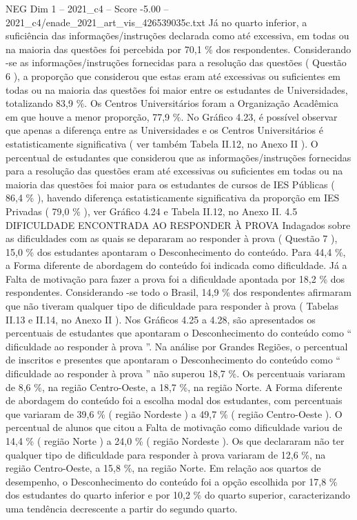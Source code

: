 \begin{textsample}{NEG Dim 1 – 2021\_c4 – Score -5.00 – 2021\_c4/enade\_2021\_art\_vis\_426539035c.txt}
Já no quarto inferior, a suficiência das informações/instruções declarada como até excessiva, em todas ou na maioria das questões foi percebida por 70,1 \% dos respondentes.
Considerando -se as informações/instruções fornecidas para a resolução das questões ( Questão 6 ), a proporção que considerou que estas eram até excessivas ou suficientes em todas ou na maioria das questões foi maior entre os estudantes de Universidades, totalizando 83,9 \%.
Os Centros Universitários foram a Organização Acadêmica em que houve a menor proporção, 77,9 \%.
No Gráfico 4.23, é possível observar que apenas a diferença entre as Universidades e os Centros Universitários é estatisticamente significativa ( ver também Tabela II.12, no Anexo II ).
O percentual de estudantes que considerou que as informações/instruções fornecidas para a resolução das questões eram até excessivas ou suficientes em todas ou na maioria das questões foi maior para os estudantes de cursos de IES Públicas ( 86,4 \% ), havendo diferença estatisticamente significativa da proporção em IES Privadas ( 79,0 \% ), ver Gráfico 4.24 e Tabela II.12, no Anexo II. 4.5 DIFICULDADE ENCONTRADA AO RESPONDER À PROVA Indagados sobre as dificuldades com as quais se depararam ao responder à prova ( Questão 7 ), 15,0 \% dos estudantes apontaram o Desconhecimento do conteúdo.
Para 44,4 \%, a Forma diferente de abordagem do conteúdo foi indicada como dificuldade.
Já a Falta de motivação para fazer a prova foi a dificuldade apontada por 18,2 \% dos respondentes.
Considerando -se todo o Brasil, 14,9 \% dos respondentes afirmaram que não tiveram qualquer tipo de dificuldade para responder à prova ( Tabelas II.13 e II.14, no Anexo II ).
Nos Gráficos 4.25 a 4.28, são apresentados os percentuais de estudantes que apontaram o Desconhecimento do conteúdo como “ dificuldade ao responder à prova ”.
Na análise por Grandes Regiões, o percentual de inscritos e presentes que apontaram o Desconhecimento do conteúdo como “ dificuldade ao responder à prova ” não superou 18,7 \%.
Os percentuais variaram de 8,6 \%, na região Centro-Oeste, a 18,7 \%, na região Norte.
A Forma diferente de abordagem do conteúdo foi a escolha modal dos estudantes, com percentuais que variaram de 39,6 \% ( região Nordeste ) a 49,7 \% ( região Centro-Oeste ).
O percentual de alunos que citou a Falta de motivação como dificuldade variou de 14,4 \% ( região Norte ) a 24,0 \% ( região Nordeste ).
Os que declararam não ter qualquer tipo de dificuldade para responder à prova variaram de 12,6 \%, na região Centro-Oeste, a 15,8 \%, na região Norte.
Em relação aos quartos de desempenho, o Desconhecimento do conteúdo foi a opção escolhida por 17,8 \% dos estudantes do quarto inferior e por 10,2 \% do quarto superior, caracterizando uma tendência decrescente a partir do segundo quarto.

\end{textsample}
